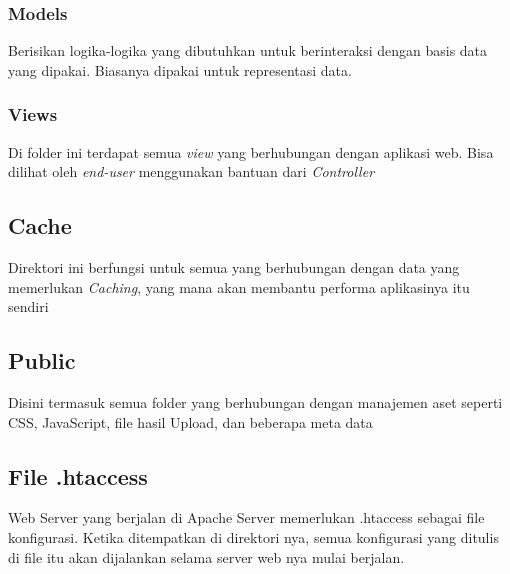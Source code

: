 \subsubsection{Models}
Berisikan logika-logika yang dibutuhkan untuk berinteraksi dengan basis data yang dipakai. Biasanya dipakai untuk representasi data.
\subsubsection{Views}
Di folder ini terdapat semua \textit{view} yang berhubungan dengan aplikasi web. Bisa dilihat oleh \textit{end-user} menggunakan bantuan dari \textit{Controller}
\subsection{Cache}
Direktori ini berfungsi untuk semua yang berhubungan dengan data yang memerlukan \textit{Caching}, yang mana akan membantu performa aplikasinya itu sendiri
\subsection{Public}
Disini termasuk semua folder yang berhubungan dengan manajemen aset seperti CSS, JavaScript, file hasil Upload, dan beberapa meta data
\subsection{File .htaccess}
Web Server yang berjalan di Apache Server memerlukan .htaccess sebagai file konfigurasi. Ketika ditempatkan di direktori nya, semua konfigurasi yang ditulis di file itu akan dijalankan selama server web nya mulai berjalan.